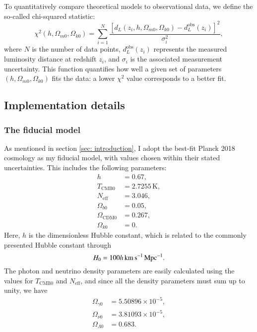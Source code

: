 \documentclass{aa}
\begin{document}
To quantitatively compare theoretical models to observational data, we define the so-called chi-squared statistic:
\begin{equation}
  \chi^2(h, \Omega_{m0}, \Omega_{k0}) = \sum_{i=1}^{N} \frac{ \left[ d_L(z_i, h, \Omega_{m0}, \Omega_{k0}) - d_L^{\text{obs}}(z_i) \right]^2 }{\sigma_i^2},
\end{equation}
where $N$ is the number of data points, $d_L^{\text{obs}}(z_i)$ represents the measured luminosity distance at redshift $z_i$, and $\sigma_i$ is the associated measurement uncertainty. This function quantifies how well a given set of parameters $(h, \Omega_{m0}, \Omega_{k0})$ fits the data: a lower $\chi^2$ value corresponds to a better fit. 


\subsection{Implementation details}\label{subsec: I methods}
\subsubsection{The fiducial model}\label{subsubsec: I methods fiducial}
As mentioned in section \ref{sec: introduction}, I adopt the best-fit Planck 2018 cosmology \citep[see][]{Planck} as my fiducial model, with values chosen within their stated uncertainties. This includes the following parameters:
\begin{align*}
    h &= 0.67,
    \\
    T_{\text{CMB}0} &= 2.7255\,\text{K},
    \\
    N_\text{eff} &= 3.046,
    \\
    \Omega_{b0} &= 0.05,
    \\
    \Omega_{\text{CDM}0} &= 0.267,
    \\
    \Omega_{k0} &= 0.
\end{align*}
Here, $h$ is the dimensionless Hubble constant, which is related to the commonly presented Hubble constant through
\begin{equation*}
    H_0 = 100h\,\text{km\,s}^{-1}\text{\,Mpc}^{-1}.
\end{equation*}
The photon and neutrino density parameters are easily calculated using the values for $T_{\text{CMB}0}$ and $N_\text{eff}$, and since all the density parameters must sum up to unity, we have
\begin{align*}
  \Omega_{\gamma0} &= 5.50896\times10^{-5},
  \\
  \Omega_{\nu0} &=  3.81093\times10^{-5},
  \\
  \Omega_{\Lambda0} &= 0.683.
\end{align*}
\end{document}
